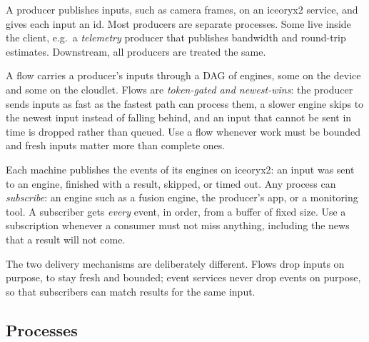 \documentclass[11pt]{article}
\begin{document}
\begin{description}[style=nextline, leftmargin=1.5em]
  \item[Producers create inputs.] A producer publishes inputs, such as camera
        frames, on an iceoryx2 service, and gives each input an id. Most
        producers are separate processes. Some live inside the client, e.g.\ a
        \emph{telemetry} producer that publishes bandwidth and round-trip
        estimates. Downstream, all producers are treated the same.
  \item[Flows bound and route work.] A flow carries a producer's inputs through
        a DAG of engines, some on the device and some on the cloudlet. Flows
        are \emph{token-gated and newest-wins}: the producer sends inputs as
        fast as the fastest path can process them, a slower engine skips to the
        newest input instead of falling behind, and an input that cannot be
        sent in time is dropped rather than queued. Use a flow whenever work
        must be bounded and fresh inputs matter more than complete ones.
  \item[Event services report what happened.] Each machine publishes the
        events of its engines on iceoryx2: an input was sent to an engine,
        finished with a result, skipped, or timed out. Any process can
        \emph{subscribe}: an engine such as a fusion engine, the producer's
        app, or a monitoring tool. A subscriber gets \emph{every} event, in
        order, from a buffer of fixed size. Use a subscription whenever a
        consumer must not miss anything, including the news that a result will
        not come.
\end{description}

The two delivery mechanisms are deliberately different. Flows drop inputs on
purpose, to stay fresh and bounded; event services never drop events on
purpose, so that subscribers can match results for the same input.

\subsection{Processes}
\end{document}
